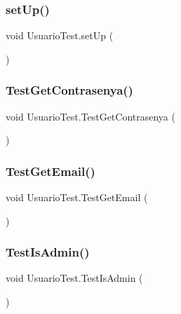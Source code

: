 \subsubsection{\texorpdfstring{setUp()}{setUp()}}
{\footnotesize\ttfamily void Usuario\+Test.\+set\+Up (\begin{DoxyParamCaption}{ }\end{DoxyParamCaption})}

\mbox{\label{class_usuario_test_af7931a1dbcf5d80d80ffb49c30306ab7}} 
\subsubsection{\texorpdfstring{TestGetContrasenya()}{TestGetContrasenya()}}
{\footnotesize\ttfamily void Usuario\+Test.\+Test\+Get\+Contrasenya (\begin{DoxyParamCaption}{ }\end{DoxyParamCaption})}

\mbox{\label{class_usuario_test_a1edbba82e373eca6120a82cf9e35ab69}} 
\subsubsection{\texorpdfstring{TestGetEmail()}{TestGetEmail()}}
{\footnotesize\ttfamily void Usuario\+Test.\+Test\+Get\+Email (\begin{DoxyParamCaption}{ }\end{DoxyParamCaption})}

\mbox{\label{class_usuario_test_a19d128d4d51d608e2445eee6b6f32254}} 
\subsubsection{\texorpdfstring{TestIsAdmin()}{TestIsAdmin()}}
{\footnotesize\ttfamily void Usuario\+Test.\+Test\+Is\+Admin (\begin{DoxyParamCaption}{ }\end{DoxyParamCaption})}

